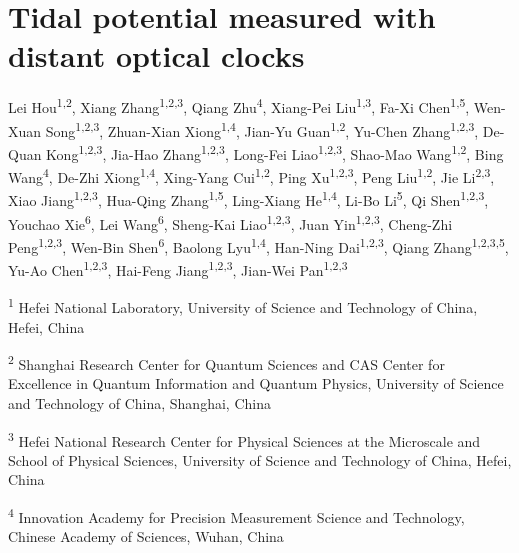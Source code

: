 \documentclass[
  11pt,
  a4paper,
]{article}
\author{}
\date{}
\begin{document}
\onehalfspacing
\linenumbers

\hypertarget{tidal-potential-measured-with-distant-optical-clocks}{%
\section{Tidal potential measured with distant optical
clocks}\label{tidal-potential-measured-with-distant-optical-clocks}}

\begingroup\singlespacing\small\nolinenumbers

Lei Hou\textsuperscript{1,2}, Xiang Zhang\textsuperscript{1,2,3}, Qiang
Zhu\textsuperscript{4}, Xiang-Pei Liu\textsuperscript{1,3}, Fa-Xi
Chen\textsuperscript{1,5}, Wen-Xuan Song\textsuperscript{1,2,3},
Zhuan-Xian Xiong\textsuperscript{1,4}, Jian-Yu
Guan\textsuperscript{1,2}, Yu-Chen Zhang\textsuperscript{1,2,3}, De-Quan
Kong\textsuperscript{1,2,3}, Jia-Hao Zhang\textsuperscript{1,2,3},
Long-Fei Liao\textsuperscript{1,2,3}, Shao-Mao
Wang\textsuperscript{1,2}, Bing Wang\textsuperscript{4}, De-Zhi
Xiong\textsuperscript{1,4}, Xing-Yang Cui\textsuperscript{1,2}, Ping
Xu\textsuperscript{1,2,3}, Peng Liu\textsuperscript{1,2}, Jie
Li\textsuperscript{2,3}, Xiao Jiang\textsuperscript{1,2,3}, Hua-Qing
Zhang\textsuperscript{1,5}, Ling-Xiang He\textsuperscript{1,4}, Li-Bo
Li\textsuperscript{5}, Qi Shen\textsuperscript{1,2,3}, Youchao
Xie\textsuperscript{6}, Lei Wang\textsuperscript{6}, Sheng-Kai
Liao\textsuperscript{1,2,3}, Juan Yin\textsuperscript{1,2,3}, Cheng-Zhi
Peng\textsuperscript{1,2,3}, Wen-Bin Shen\textsuperscript{6}, Baolong
Lyu\textsuperscript{1,4}, Han-Ning Dai\textsuperscript{1,2,3}, Qiang
Zhang\textsuperscript{1,2,3,5}, Yu-Ao Chen\textsuperscript{1,2,3},
Hai-Feng Jiang\textsuperscript{1,2,3}, Jian-Wei
Pan\textsuperscript{1,2,3}

\textsuperscript{1} Hefei National Laboratory, University of Science and
Technology of China, Hefei, China

\textsuperscript{2} Shanghai Research Center for Quantum Sciences and
CAS Center for Excellence in Quantum Information and Quantum Physics,
University of Science and Technology of China, Shanghai, China

\textsuperscript{3} Hefei National Research Center for Physical Sciences
at the Microscale and School of Physical Sciences, University of Science
and Technology of China, Hefei, China

\textsuperscript{4} Innovation Academy for Precision Measurement Science
and Technology, Chinese Academy of Sciences, Wuhan, China
\end{document}
